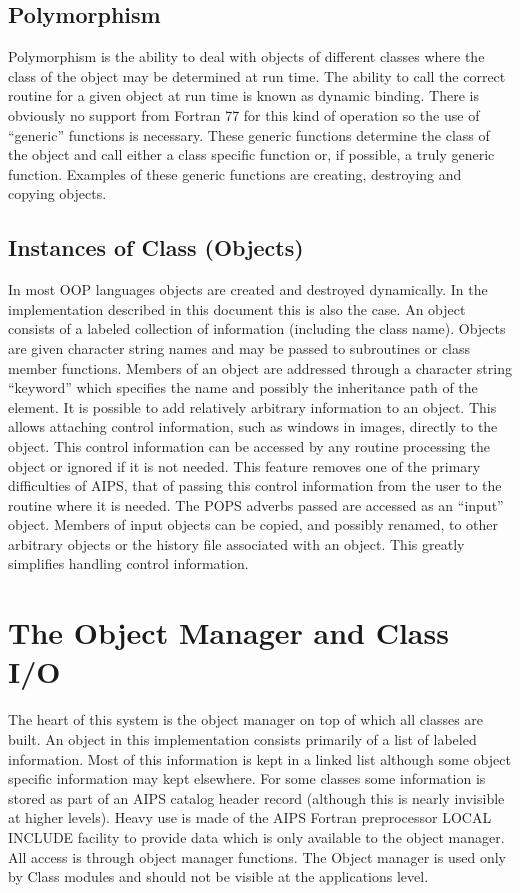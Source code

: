 \subsection{Polymorphism}
    Polymorphism is the ability to deal with objects of different
classes where the class of the object may be determined at run time.
The ability to call the correct routine for a given object at run time
is known as dynamic binding.  There is obviously no support from
Fortran 77 for this kind of operation so the use of ``generic''
functions is necessary.  These generic functions determine the class
of the object and call either a class specific function or, if
possible, a truly generic function.  Examples of these generic
functions are creating, destroying and copying objects.

\subsection{Instances of Class (Objects)}
   In most OOP languages objects are created and destroyed
dynamically.  In the implementation described in this document this is
also the case.  An object consists of a labeled collection of
information (including the class name).  Objects are given character
string names and may be passed to subroutines or class member
functions.  Members of an object are addressed through a character
string ``keyword'' which specifies the name and possibly the inheritance
path of the element.
   It is possible to add relatively arbitrary information to an
object.  This allows attaching control information, such as windows in
images, directly to the object.  This control information can be
accessed by any routine processing the object or ignored if it is not
needed.  This feature removes one of the primary difficulties of
AIPS, that of passing this control information from the user to the
routine where it is needed.  The POPS adverbs passed are accessed as
an ``input'' object.  Members of input objects can be copied, and
possibly renamed, to other arbitrary objects or the history file
associated with an object.  This greatly simplifies
handling control information.

\section{The Object Manager and Class I/O}

   The heart of this system is the object manager on top of which all
classes are built.  An object in this implementation consists
primarily of a list of labeled information.  Most of this information
is kept in a linked list although some object specific information may
kept elsewhere.  For some classes some information is stored
as part of an AIPS catalog header record (although this is nearly
invisible at higher levels).  Heavy use is made of the AIPS Fortran
preprocessor LOCAL INCLUDE facility to provide data which is only
available to the object manager.  All access is through object manager
functions.  The Object manager is used only by Class modules and
should not be visible at the applications level.

